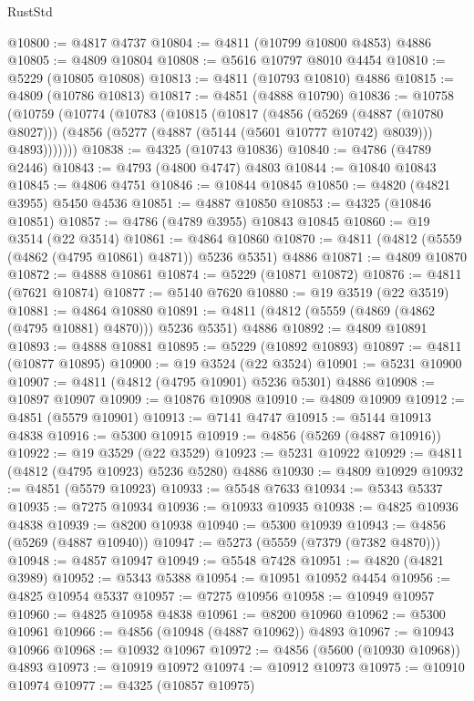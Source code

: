 \begin{lexlean}{RustStd}
\begin{coremodule}
{\begin{coremodule}
{{{{{{{{{{{{{{{{{{{{{{{{{{{{{{{{{{{{{{{{{{{{{{{{{{{{{{{{{{{{{{{{{{{{{{{{{{{{{{{{@10800 := @4817 @4737
@10804 := @4811 (@10799 @10800 @4853) @4886
@10805 := @4809 @10804
@10808 := @5616 @10797 @8010 @4454
@10810 := @5229 (@10805 @10808)
@10813 := @4811 (@10793 @10810) @4886
@10815 := @4809 (@10786 @10813)
@10817 := @4851 (@4888 @10790)
@10836 := @10758
    (@10759
      (@10774
        (@10783
          (@10815
            (@10817
              (@4856
                (@5269 (@4887 (@10780 @8027)))
                (@4856 (@5277 (@4887 (@5144 (@5601 @10777 @10742) @8039))) @4893)))))))
@10838 := @4325 (@10743 @10836)
@10840 := @4786 (@4789 @2446)
@10843 := @4793 (@4800 @4747) @4803
@10844 := @10840 @10843
@10845 := @4806 @4751
@10846 := @10844 @10845
@10850 := @4820 (@4821 @3955) @5450 @4536
@10851 := @4887 @10850
@10853 := @4325 (@10846 @10851)
@10857 := @4786 (@4789 @3955) @10843 @10845
@10860 := @19 @3514 (@22 @3514)
@10861 := @4864 @10860
@10870 := @4811 (@4812 (@5559 (@4862 (@4795 @10861) @4871)) @5236 @5351) @4886
@10871 := @4809 @10870
@10872 := @4888 @10861
@10874 := @5229 (@10871 @10872)
@10876 := @4811 (@7621 @10874)
@10877 := @5140 @7620
@10880 := @19 @3519 (@22 @3519)
@10881 := @4864 @10880
@10891 := @4811 (@4812 (@5559 (@4869 (@4862 (@4795 @10881) @4870))) @5236 @5351) @4886
@10892 := @4809 @10891
@10893 := @4888 @10881
@10895 := @5229 (@10892 @10893)
@10897 := @4811 (@10877 @10895)
@10900 := @19 @3524 (@22 @3524)
@10901 := @5231 @10900
@10907 := @4811 (@4812 (@4795 @10901) @5236 @5301) @4886
@10908 := @10897 @10907
@10909 := @10876 @10908
@10910 := @4809 @10909
@10912 := @4851 (@5579 @10901)
@10913 := @7141 @4747
@10915 := @5144 @10913 @4838
@10916 := @5300 @10915
@10919 := @4856 (@5269 (@4887 @10916))
@10922 := @19 @3529 (@22 @3529)
@10923 := @5231 @10922
@10929 := @4811 (@4812 (@4795 @10923) @5236 @5280) @4886
@10930 := @4809 @10929
@10932 := @4851 (@5579 @10923)
@10933 := @5548 @7633
@10934 := @5343 @5337
@10935 := @7275 @10934
@10936 := @10933 @10935
@10938 := @4825 @10936 @4838
@10939 := @8200 @10938
@10940 := @5300 @10939
@10943 := @4856 (@5269 (@4887 @10940))
@10947 := @5273 (@5559 (@7379 (@7382 @4870)))
@10948 := @4857 @10947
@10949 := @5548 @7428
@10951 := @4820 (@4821 @3989)
@10952 := @5343 @5388
@10954 := @10951 @10952 @4454
@10956 := @4825 @10954 @5337
@10957 := @7275 @10956
@10958 := @10949 @10957
@10960 := @4825 @10958 @4838
@10961 := @8200 @10960
@10962 := @5300 @10961
@10966 := @4856 (@10948 (@4887 @10962)) @4893
@10967 := @10943 @10966
@10968 := @10932 @10967
@10972 := @4856 (@5600 (@10930 @10968)) @4893
@10973 := @10919 @10972
@10974 := @10912 @10973
@10975 := @10910 @10974
@10977 := @4325 (@10857 @10975)
}}}}}}}}}}}}}}}}}}}}}}}}}}}}}}}}}}}}}}}}}}}}}}}}}}}}}}}}}}}}}}}}}}}}}}}}}}}}}}}}
\end{coremodule}}
\end{coremodule}
\end{lexlean}
